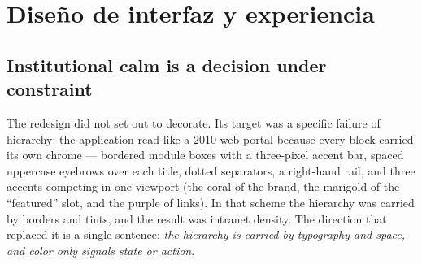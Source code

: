 
\section{Diseño de interfaz y experiencia}

\subsection{Institutional calm is a decision under constraint}

The redesign did not set out to decorate. Its target was a specific failure of hierarchy: the
application read like a 2010 web portal because every block carried its own chrome — bordered
module boxes with a three-pixel accent bar, spaced uppercase eyebrows over each title, dotted
separators, a right-hand rail, and three accents competing in one viewport (the coral of the
brand, the marigold of the \enquote{featured} slot, and the purple of links). In that scheme the
hierarchy was carried by borders and tints, and the result was intranet density. The direction
that replaced it is a single sentence: \emph{the hierarchy is carried by typography and space, and
color only signals state or action}.

